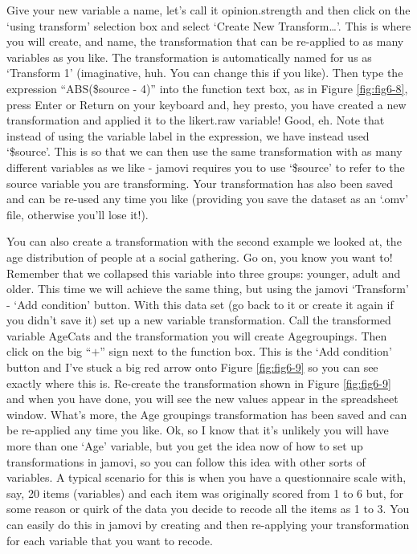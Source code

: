 \documentclass[
]{book}
\begin{document}
Give your new variable a name, let's call it opinion.strength and then click on the `using transform' selection box and select `Create New Transform\ldots{}'. This is where you will create, and name, the transformation that can be re-applied to as many variables as you like. The transformation is automatically named for us as `Transform 1' (imaginative, huh. You can change this if you like). Then type the expression ``ABS(\$source - 4)'' into the function text box, as in Figure \ref{fig:fig6-8}, press Enter or Return on your keyboard and, hey presto, you have created a new transformation and applied it to the likert.raw variable! Good, eh. Note that instead of using the variable label in the expression, we have instead used `\$source'. This is so that we can then use the same transformation with as many different variables as we like - jamovi requires you to use `\$source' to refer to the source variable you are transforming. Your transformation has also been saved and can be re-used any time you like (providing you save the dataset as an `.omv' file, otherwise you'll lose it!).

You can also create a transformation with the second example we looked at, the age distribution of people at a social gathering. Go on, you know you want to! Remember that we collapsed this variable into three groups: younger, adult and older. This time we will achieve the same thing, but using the jamovi `Transform' - `Add condition' button. With this data set (go back to it or create it again if you didn't save it) set up a new variable transformation. Call the transformed variable AgeCats and the transformation you will create Agegroupings. Then click on the big ``\(+\)'' sign next to the function box. This is the `Add condition' button and I've stuck a big red arrow onto Figure \ref{fig:fig6-9} so you can see exactly where this is. Re-create the transformation shown in Figure \ref{fig:fig6-9} and when you have done, you will see the new values appear in the spreadsheet window. What's more, the Age groupings transformation has been saved and can be re-applied any time you like. Ok, so I know that it's unlikely you will have more than one `Age' variable, but you get the idea now of how to set up transformations in jamovi, so you can follow this idea with other sorts of variables. A typical scenario for this is when you have a questionnaire scale with, say, 20 items (variables) and each item was originally scored from 1 to 6 but, for some reason or quirk of the data you decide to recode all the items as 1 to 3. You can easily do this in jamovi by creating and then re-applying your transformation for each variable that you want to recode.
\end{document}
